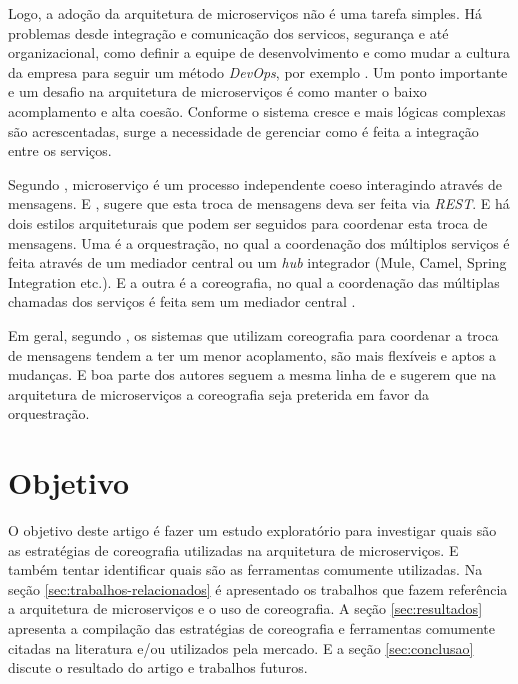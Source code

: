 \documentclass[12pt]{article}
\theoremstyle{plain}
\begin{document}
Logo, a adoção da arquitetura de microserviços não é uma tarefa simples. Há problemas desde integração e comunicação dos servicos, segurança e até organizacional, como definir a equipe de desenvolvimento e como mudar a cultura da empresa para seguir um método \textit{DevOps}, por exemplo \cite{jung:2017}. Um ponto importante e um desafio na arquitetura de microserviços é como manter o baixo acomplamento e alta coesão. Conforme o sistema cresce e mais lógicas complexas são acrescentadas, surge a necessidade de gerenciar como é feita a integração entre os serviços. 

Segundo \cite{Dragoni2017}, microserviço é um processo independente coeso interagindo através de mensagens. E \cite{Newman:15}, sugere que esta troca de mensagens deva ser feita via \textit{REST}. E há dois estilos arquiteturais que podem ser seguidos para coordenar esta troca de mensagens. Uma é a orquestração, no qual a coordenação dos múltiplos serviços é feita através de um mediador central ou um \textit{hub} integrador (Mule, Camel, Spring Integration etc.). E a outra é a coreografia, no qual a coordenação das múltiplas chamadas dos serviços é feita sem um mediador central \cite{richards:15, Newman:15}. 

Em geral, segundo \cite{Newman:15}, os sistemas que utilizam coreografia para coordenar a troca de mensagens tendem a ter um menor acoplamento, são mais flexíveis e aptos a mudanças. E boa parte dos autores \cite{wolf:2018, Dragoni2017, richards:15, Alshuqayran:2016} seguem a mesma linha de \cite{Newman:15} e sugerem que na arquitetura de microserviços a coreografia seja preterida em favor da orquestração.

\section{Objetivo} \label{sec:firstpage}

O objetivo deste artigo é fazer um estudo exploratório para investigar quais são as estratégias de coreografia utilizadas na arquitetura de microserviços. E também tentar identificar quais são as ferramentas comumente utilizadas. Na seção \ref{sec:trabalhos-relacionados} é apresentado os trabalhos que fazem referência a arquitetura de microserviços e o uso de coreografia. A seção \ref{sec:resultados} apresenta a compilação das estratégias de coreografia e ferramentas comumente citadas na literatura e/ou utilizados pela mercado. E a seção \ref{sec:conclusao} discute o resultado do artigo e trabalhos futuros.
\end{document}
